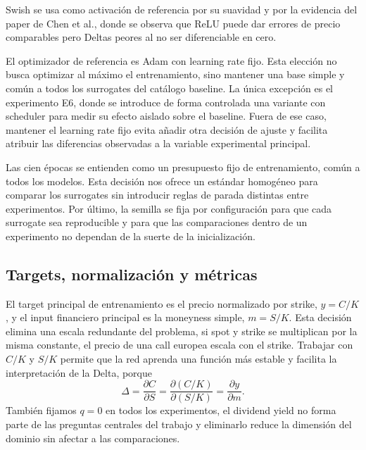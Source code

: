 \documentclass[11pt,a4paper]{article}
\begin{document}
Swish se usa como activación de referencia por su suavidad y por la evidencia del paper de Chen et al., donde se observa que ReLU puede dar errores de precio comparables pero Deltas peores al no ser diferenciable en cero.

El optimizador de referencia es Adam con learning rate fijo. Esta elección no busca optimizar al máximo el entrenamiento, sino mantener una base simple y común a todos los surrogates del catálogo baseline. La única excepción es el experimento E6, donde se introduce de forma controlada una variante con scheduler para medir su efecto aislado sobre el baseline. Fuera de ese caso, mantener el learning rate fijo evita añadir otra decisión de ajuste y facilita atribuir las diferencias observadas a la variable experimental principal.

Las cien épocas se entienden como un presupuesto fijo de entrenamiento, común a todos los modelos. Esta decisión nos ofrece un estándar homogéneo para comparar los surrogates sin introducir reglas de parada distintas entre experimentos. Por último, la semilla se fija por configuración para que cada surrogate sea reproducible y para que las comparaciones dentro de un experimento no dependan de la suerte de la inicialización.

\subsection{Targets, normalización y métricas}

El target principal de entrenamiento es el precio normalizado por strike, $y = C/K$, y el input financiero principal es la moneyness simple, $m = S/K$. Esta decisión elimina una escala redundante del problema, si spot y strike se multiplican por la misma constante, el precio de una call europea escala con el strike. Trabajar con $C/K$ y $S/K$ permite que la red aprenda una función más estable y facilita la interpretación de la Delta, porque
\begin{equation}
\Delta = \frac{\partial C}{\partial S} = \frac{\partial (C/K)}{\partial (S/K)} = \frac{\partial y}{\partial m}.
\end{equation}
También fijamos $q = 0$ en todos los experimentos, el dividend yield no forma parte de las preguntas centrales del trabajo y eliminarlo reduce la dimensión del dominio sin afectar a las comparaciones.
\end{document}
